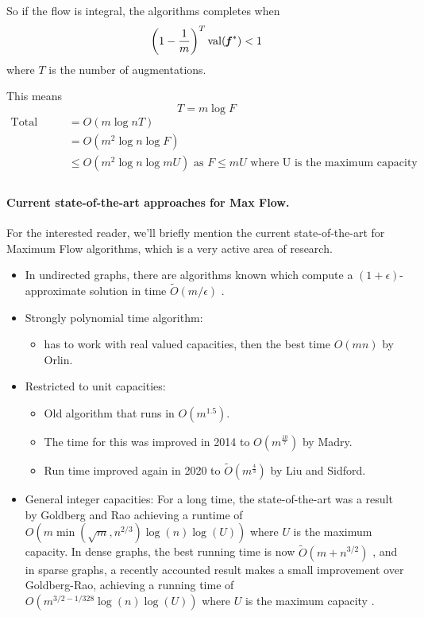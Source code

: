 So if the flow is integral, the algorithms completes when
\begin{equation}\nonumber
    \left( 1 - \frac{1}{m}\right)^T \operatorname*{val}(\boldsymbol{\mathit{f}}^*) < 1
\end{equation}
where $T$ is the number of augmentations.

This means
\begin{equation}\nonumber
    T = m \log{F}
\end{equation}
\begin{align*}
\text{Total time} &= O(m \log{n} T) \\
                  &= O(m^2 \log{n} \log{F})\\
                  &\leq O(m^2 \log{n} \log{mU}) \text { as }  F \leq m U \text{ where U is the maximum capacity}\\
\end{align*}

\paragraph{Current state-of-the-art approaches for Max Flow.} For the
interested reader, we'll briefly mention the current state-of-the-art
for Maximum Flow algorithms, which is a  very active area of research.
\begin{itemize}
   \item In undirected graphs, there are algorithms known which
     compute a $(1+\epsilon)$-approximate solution in time
     $\tilde{O}(m/\epsilon)$ \cite{S17}.
    \item Strongly polynomial time algorithm:
     \begin{itemize}
       \item has to work with real valued capacities, then the best time $O(mn)$ by Orlin.
    \end{itemize}
    \item Restricted to unit capacities:
    \begin{itemize}
        \item Old algorithm that runs in \(O(m^{1.5})\).
        \item The time for this was improved in 2014 to
          \(O(m^{\frac{10}{7}} )\) by Madry.
        \item Run time improved again in 2020 to \(\tilde{O}(m^{\frac{4}{3}})\) by Liu and Sidford.
    \end{itemize}
  \item General integer capacities: For a long time, the
    state-of-the-art was a result by Goldberg and Rao achieving a
    runtime of \(O(m \min(\sqrt{m},n^{2/3}) \log(n) \log(U) )\) where $U$ is the
    maximum capacity.
    In dense graphs, the best running time is now $\tilde{O}(m +
    n^{3/2})$ \cite{BLLSSSW21}, and in sparse graphs, a recently
    accounted result makes a small improvement over Goldberg-Rao,
    achieving a running time of  \(O(m^{3/2 - 1/328} \log(n) \log(U) )\) where $U$ is the
    maximum capacity \cite{GLP21}.
\end{itemize}
%


